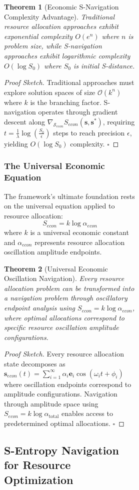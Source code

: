 \documentclass[12pt,a4paper]{article}
\newtheorem{theorem}{Theorem}
\begin{document}
\begin{figure}[H]
\begin{figure}[H]
\begin{figure}[H]
\begin{theorem}[Economic S-Navigation Complexity Advantage]
Traditional resource allocation approaches exhibit exponential complexity $O(e^n)$ where $n$ is problem size, while S-navigation approaches exhibit logarithmic complexity $O(\log S_0)$ where $S_0$ is initial S-distance.
\end{theorem}

\begin{proof}[Proof Sketch]
Traditional approaches must explore solution spaces of size $\mathcal{O}(k^n)$ where $k$ is the branching factor. S-navigation operates through gradient descent along $\nabla_{\mathcal{S}_{econ}} S_{econ}(\mathbf{s}, \mathbf{s}^*)$, requiring $t = \frac{1}{\lambda} \log(\frac{S_0}{\epsilon})$ steps to reach precision $\epsilon$, yielding $O(\log S_0)$ complexity. $\square$
\end{proof}

\subsubsection{The Universal Economic Equation}

The framework's ultimate foundation rests on the universal equation applied to resource allocation:
\begin{equation}
S_{econ} = k \log \alpha_{econ}
\end{equation}
where $k$ is a universal economic constant and $\alpha_{econ}$ represents resource allocation oscillation amplitude endpoints.

\begin{theorem}[Universal Economic Oscillation Navigation]
Every resource allocation problem can be transformed into a navigation problem through oscillatory endpoint analysis using $S_{econ} = k \log \alpha_{econ}$, where optimal allocations correspond to specific resource oscillation amplitude configurations.
\end{theorem}

\begin{proof}[Proof Sketch]
Every resource allocation state decomposes as $\mathbf{s}_{econ}(t) = \sum_{i=1}^{\infty} \alpha_i \mathbf{e}_i \cos(\omega_i t + \phi_i)$ where oscillation endpoints correspond to amplitude configurations. Navigation through amplitude space using $S_{econ} = k \log \alpha_{\text{total}}$ enables access to predetermined optimal allocations. $\square$
\end{proof}

\subsection{S-Entropy Navigation for Resource Optimization}


\end{figure}
\end{figure}
\end{figure}
\end{document}
